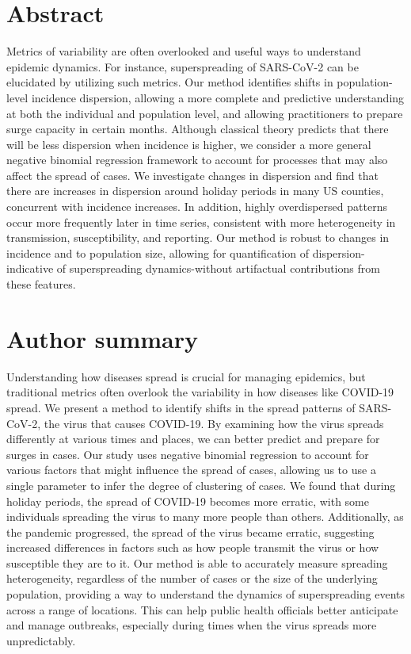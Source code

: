 \documentclass[10pt,letterpaper]{article}
\begin{document}
\section*{Abstract}
Metrics of variability are often overlooked and useful ways to understand epidemic dynamics. 
For instance, superspreading of SARS-CoV-2 can be elucidated by utilizing such metrics. Our method identifies shifts in population-level incidence dispersion, allowing a more complete and predictive understanding at both the individual and population level, and allowing practitioners to prepare surge capacity in certain months. 
Although classical theory predicts that there will be less dispersion when incidence is higher, we consider a more general negative binomial regression framework to account for processes that may also affect the spread of cases. 
We investigate changes in dispersion and find that there are increases in dispersion around holiday periods in many US counties, concurrent with incidence increases. 
In addition, highly overdispersed patterns occur more frequently later in time series, consistent with more heterogeneity in transmission, susceptibility, and reporting. 
Our method is robust to changes in incidence and to population size, allowing for quantification of dispersion-indicative of superspreading dynamics-without artifactual contributions from these features.


\section*{Author summary}
Understanding how diseases spread is crucial for managing epidemics, but traditional metrics often overlook the variability in how diseases like COVID-19 spread. 
We present a method to identify shifts in the spread patterns of SARS-CoV-2, the virus that causes COVID-19. 
By examining how the virus spreads differently at various times and places, we can better predict and prepare for surges in cases.
Our study uses negative binomial regression to account for various factors that might influence the spread of cases, allowing us to use a single parameter to infer the degree of clustering of cases. 
We found that during holiday periods, the spread of COVID-19 becomes more erratic, with some individuals spreading the virus to many more people than others. 
Additionally, as the pandemic progressed, the spread of the virus became erratic, suggesting increased differences in factors such as how people transmit the virus or how susceptible they are to it.
Our method is able to accurately measure spreading heterogeneity, regardless of the number of cases or the size of the underlying population, providing a way to understand the dynamics of superspreading events across a range of locations.
This can help public health officials better anticipate and manage outbreaks, especially during times when the virus spreads more unpredictably.
\end{document}
